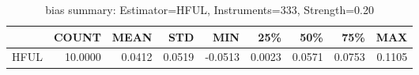 \begin{table}[ht]
\centering
\caption{bias summary: Estimator=HFUL, Instruments=333, Strength=0.20}
\begin{tabular}{lrrrrrrrr}
\toprule
 & COUNT & MEAN & STD & MIN & 25\% & 50\% & 75\% & MAX \\
\midrule
HFUL & 10.0000 & 0.0412 & 0.0519 & -0.0513 & 0.0023 & 0.0571 & 0.0753 & 0.1105 \\
\bottomrule
\end{tabular}
\end{table}
